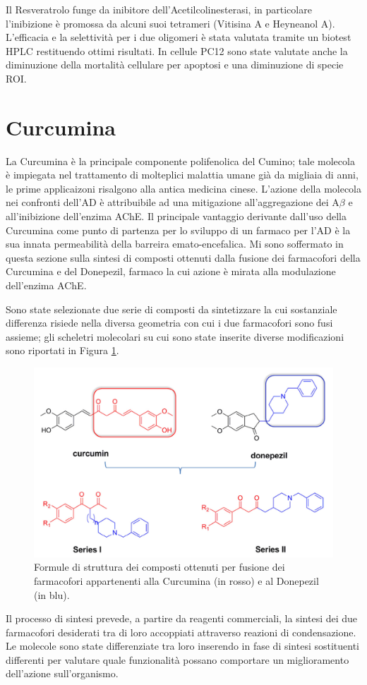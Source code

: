 \documentclass[a4paper, 11pt]{article}
\begin{document}
Il Resveratrolo funge da inibitore dell'Acetilcolinesterasi, in particolare l'inibizione è promossa da alcuni suoi tetrameri (Vitisina A e Heyneanol A). L'efficacia e la selettività per i due oligomeri è stata valutata tramite un biotest HPLC restituendo ottimi risultati. In cellule PC12 sono state valutate anche la diminuzione della mortalità cellulare per apoptosi e una diminuzione di specie ROI.

\section{Curcumina}
La Curcumina è la principale componente polifenolica del Cumino; tale molecola è impiegata nel trattamento di molteplici malattia umane già da migliaia di anni, le prime applicaizoni risalgono alla antica medicina cinese.  L'azione della molecola nei confronti dell'AD è attribuibile ad una mitigazione all'aggregazione dei A$\beta$ e all'inibizione dell'enzima AChE. Il principale vantaggio derivante dall'uso della Curcumina come punto di partenza per lo sviluppo di un farmaco per l'AD è la sua innata permeabilità della barreira emato-encefalica. Mi sono soffermato in questa sezione sulla sintesi di composti ottenuti dalla fusione dei farmacofori della Curcumina e del Donepezil, farmaco la cui azione è mirata alla modulazione dell'enzima AChE.

Sono state selezionate due serie di composti da sintetizzare la cui sostanziale differenza risiede nella diversa geometria con cui i due farmacofori sono fusi assieme; gli scheletri molecolari su cui sono state inserite diverse modificazioni sono riportati in Figura \ref{fig:generale_curcdone}.
\begin{figure}[H]
	\centering
	\includegraphics[width=.5\linewidth]{immagini/generale_curcdone.png}
	\caption{Formule di struttura dei composti ottenuti per fusione dei farmacofori appartenenti alla Curcumina (in rosso) e al Donepezil (in blu).}
	\label{fig:generale_curcdone}
\end{figure}

Il processo di sintesi prevede, a partire da reagenti commerciali, la sintesi dei due farmacofori desiderati tra di loro accoppiati attraverso reazioni di condensazione. Le molecole sono state differenziate tra loro inserendo in fase di sintesi sostituenti differenti per valutare quale funzionalità possano comportare un miglioramento dell'azione sull'organismo.
\end{document}
